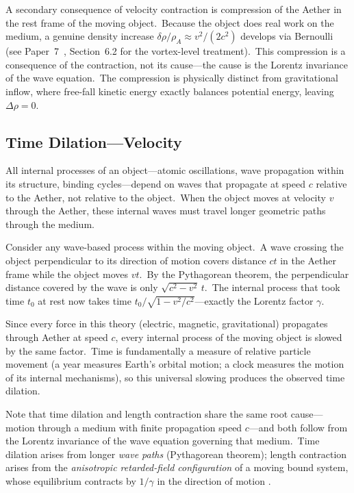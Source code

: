 ﻿\documentclass[12pt,letterpaper]{article}
\newcommand{\rhoa}{\rho_{\!A}}
\begin{document}
A secondary consequence of velocity contraction is compression of the Aether
in the rest frame of the moving object.\ Because the object does real work on
the medium, a genuine density increase $\delta\rho/\rhoa \approx v^2/(2c^2)$
develops via Bernoulli (see Paper~7~\cite{otto-quantum}, Section~6.2 for the
vortex-level treatment).\ This compression is a consequence of the
contraction, not its cause---the cause is the Lorentz invariance of the wave
equation.\ The compression is physically distinct from gravitational inflow,
where free-fall kinetic energy exactly balances potential energy, leaving
$\Delta\rho = 0$.


\subsection{Time Dilation---Velocity}

All internal processes of an object---atomic oscillations, wave propagation within its
structure, binding cycles---depend on waves that propagate at speed $c$ relative to the
Aether, not relative to the object.\ When the object moves at velocity $v$ through the
Aether, these internal waves must travel longer geometric paths through the medium.

Consider any wave-based process within the moving object.\ A wave crossing the object
perpendicular to its direction of motion covers distance $ct$ in the Aether frame while the
object moves $vt$.\ By the Pythagorean theorem, the perpendicular distance covered by the
wave is only $\sqrt{c^2 - v^2}\,t$.\ The internal process that took time $t_0$ at rest now
takes time $t_0 / \sqrt{1 - v^2/c^2}$---exactly the Lorentz factor $\gamma$.

Since every force in this theory (electric, magnetic, gravitational) propagates through
Aether at speed $c$, every internal process of the moving object is slowed by the same
factor.\ Time is fundamentally a measure of relative particle movement (a year measures
Earth's orbital motion; a clock measures the motion of its internal mechanisms), so this
universal slowing produces the observed time dilation.

Note that time dilation and length contraction share the same root cause---motion
through a medium with finite propagation speed $c$---and both follow from the
Lorentz invariance of the wave equation governing that medium.\ Time dilation
arises from longer \emph{wave paths} (Pythagorean theorem); length contraction
arises from the \emph{anisotropic retarded-field configuration} of a moving
bound system, whose equilibrium contracts by $1/\gamma$ in the direction of
motion \cite{lorentz1904}.
\end{document}
